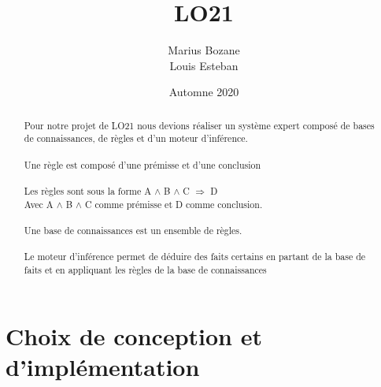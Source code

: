 \documentclass[12pt]{article}
\begin{document}
\title{LO21}
\author{Marius Bozane\\
Louis Esteban
}
\date {Automne 2020}
\maketitle

\begin{abstract}
	Pour notre projet de LO21 nous devions réaliser un système expert composé de bases de connaissances, de règles et d'un moteur d'inférence.\\
	\\	
	Une règle est composé d'une prémisse et d'une conclusion\\
	\\
	Les règles sont sous la forme A $\wedge$ B $\wedge$ C $\Rightarrow$ D\\
	Avec A $\wedge$ B $\wedge$ C comme prémisse et D comme conclusion.\\
	\\
	Une base de connaissances est un ensemble de règles.\\
	\\
	Le moteur d'inférence permet de déduire des faits certains en partant de la base de faits et en appliquant les règles de la base de connaissances
\end{abstract}

\newpage
\tableofcontents
\newpage

\newpage

\part{Choix de conception et d'implémentation}

\newpage
\end{document}
